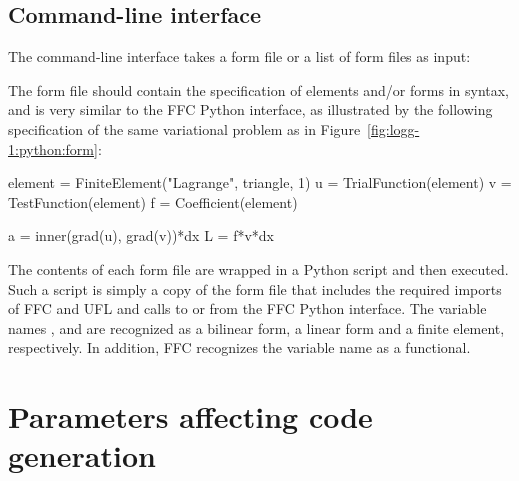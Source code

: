 \subsection{Command-line interface}

The command-line interface takes a \ufl{} form file or a list of form
files as input:
The form file should contain the specification of elements and/or
forms in \ufl{} syntax, and is very similar to the FFC Python
interface, as illustrated by the following specification of the same
variational problem as in Figure~\ref{fig:logg-1:python:form}:
\begin{uflcode}
element = FiniteElement("Lagrange", triangle, 1)
u = TrialFunction(element)
v = TestFunction(element)
f = Coefficient(element)

a = inner(grad(u), grad(v))*dx
L = f*v*dx
\end{uflcode}
The contents of each form file are wrapped in a Python script
and then executed. Such a script is simply a copy of the form file
that includes the required imports of FFC and UFL and calls to
 or  from the FFC
Python interface. The variable names , 
and  are recognized as a bilinear form, a linear form and
a finite element, respectively. In addition, FFC recognizes the
variable name  as a functional.

\section{Parameters affecting code generation}

